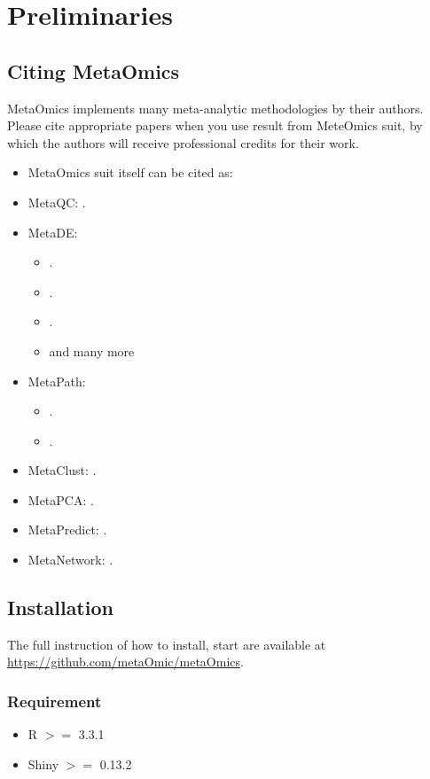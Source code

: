 \section{Preliminaries}
\subsection{Citing MetaOmics}
MetaOmics implements many meta-analytic methodologies by their authors. 
Please cite appropriate papers when you use result from MeteOmics suit,
by which the authors will receive professional credits for their work.

\begin{itemize}
\item MetaOmics suit itself can be cited as:
\item MetaQC: .
\item MetaDE: 
\begin{itemize}
\item {}.
\item {}.
\item {}.
\item and many more
\end{itemize}
\item MetaPath: 
\begin{itemize}
\item {}.
\item {}.
\end{itemize}
\item MetaClust: .
\item MetaPCA: .
\item MetaPredict: .
\item MetaNetwork: .
\end{itemize}



\subsection{Installation}
The full instruction of how to install, start are available at \url{https://github.com/metaOmic/metaOmics}.
\subsubsection{Requirement}
\begin{itemize}
\item R $>=$ 3.3.1
\item Shiny $>=$ 0.13.2
\end{itemize}

